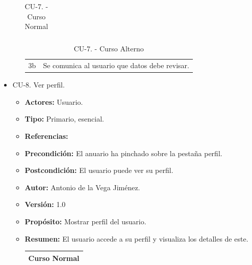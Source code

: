 \begin{itemize}
\begin{itemize}
\begin{table}[H]
\begin{tabularx}{\textwidth}{|l|X|l|X|}
      \end{tabularx}
      \caption{CU-7. - Curso Normal}
      \label{my-label}
    \end{table}
    \begin{table}[H]
      \centering
      \begin{tabularx}{\textwidth}{|l|X|}
       \hline
       \rowcolor[HTML]{C0C0C0} 
       \multicolumn{2}{|l|}{\cellcolor[HTML]{C0C0C0}Curso Alterno} \\ \hline
       \rowcolor[HTML]{FFFFFF} 
              3b                      & Se comunica al usuario que datos debe revisar.                            \\ \hline
      \end{tabularx}
      \caption{CU-7. - Curso Alterno}
      \label{my-label}
    \end{table}
  \end{itemize}
  \item CU-8. Ver perfil.
  \begin{itemize}
    \item \textbf{Actores:} Usuario.
    \item \textbf{Tipo:} Primario, esencial.
    \item \textbf{Referencias:}
    \item \textbf{Precondición:} El anuario ha pinchado sobre la pestaña perfil.
    \item \textbf{Postcondición:} El usuario puede ver su perfil.
    \item \textbf{Autor:} Antonio de la Vega Jiménez.
    \item \textbf{Versión:} 1.0
    \item \textbf{Propósito:} Mostrar perfil del usuario.
    \item \textbf{Resumen:} El usuario accede a su perfil y visualiza los detalles de este.
    \begin{table}[H]
      \centering
      \begin{tabularx}{\textwidth}{|l|X|l|X|}
        \hline
        \multicolumn{4}{|c|}{\cellcolor[HTML]{C0C0C0}Curso Normal}                                                 \\ \hline

\end{tabularx}
\end{table}
\end{itemize}
\end{itemize}
